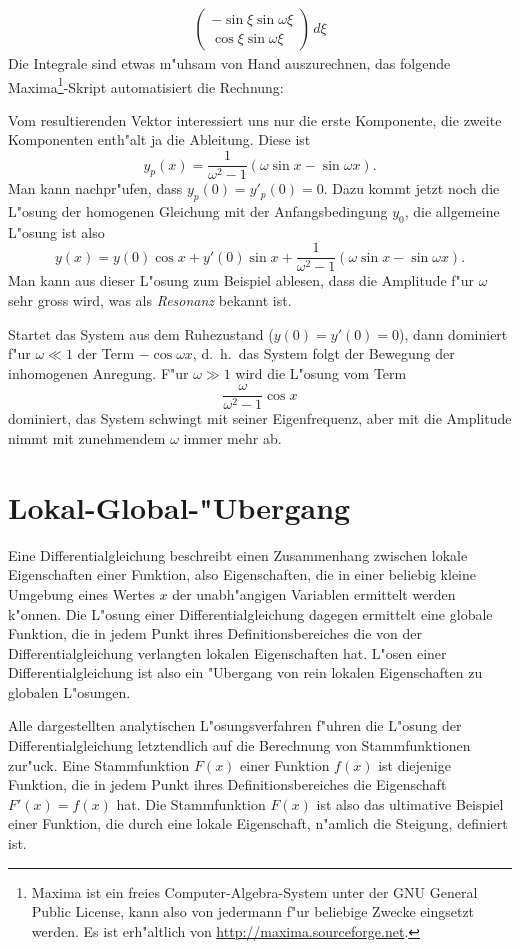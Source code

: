 \begin{beispiel}
\begin{align*}
\begin{pmatrix}
-\sin \xi\sin\omega\xi\\
 \cos \xi\sin\omega\xi
\end{pmatrix}
\,d\xi
\end{align*}
Die Integrale sind etwas m"uhsam von Hand auszurechnen, das folgende
Maxima\footnote{Maxima ist ein freies Computer-Algebra-System unter der
GNU General Public License, kann also von jedermann f"ur beliebige
Zwecke eingsetzt werden. Es ist erh"altlich von
\url{http://maxima.sourceforge.net}.}-Skript automatisiert
die Rechnung:

Vom resultierenden Vektor interessiert uns nur die erste Komponente,
die zweite Komponenten enth"alt ja die Ableitung.
Diese ist
\[
y_p(x)=\frac1{\omega^2-1}(\omega\sin x-\sin\omega x).
\]
Man kann nachpr"ufen, dass $y_p(0)=y'_p(0)=0$.
Dazu kommt jetzt noch die L"osung der homogenen Gleichung mit der
Anfangsbedingung $y_0$, die allgemeine L"osung ist also
\[
y(x)=y(0) \cos x +y'(0)\sin x+\frac1{\omega^2-1}(\omega\sin x -\sin\omega x).
\]
Man kann aus dieser L"osung zum Beispiel ablesen, dass die Amplitude
f"ur $\omega$ sehr gross wird, was als {\em Resonanz} bekannt ist.

Startet das System aus dem Ruhezustand ($y(0)=y'(0)=0$), dann dominiert
f"ur $\omega\ll 1$ der Term $-\cos\omega x$, d.~h.~das System folgt der
Bewegung der inhomogenen Anregung.
F"ur $\omega \gg 1$ wird die L"osung vom Term
\[
\frac{\omega}{\omega^2-1}\cos x
\]
dominiert, das System schwingt mit seiner Eigenfrequenz, aber mit die
Amplitude nimmt mit zunehmendem $\omega$ immer mehr ab.
\end{beispiel}

\section{Lokal-Global-"Ubergang}
Eine Differentialgleichung beschreibt einen Zusammenhang zwischen
lokale Eigenschaften einer Funktion, also Eigenschaften, die in einer
beliebig kleine Umgebung eines Wertes $x$ der unabh"angigen Variablen
ermittelt werden k"onnen.
Die L"osung einer Differentialgleichung dagegen ermittelt eine globale
Funktion, die in jedem Punkt ihres Definitionsbereiches die von der
Differentialgleichung verlangten lokalen Eigenschaften hat.
L"osen einer Differentialgleichung ist also ein "Ubergang von rein lokalen
Eigenschaften zu globalen L"osungen.

Alle dargestellten analytischen L"osungsverfahren f"uhren die L"osung
der Differentialgleichung letztendlich auf die Berechnung von Stammfunktionen
zur"uck.
Eine Stammfunktion $F(x)$ einer Funktion $f(x)$ ist diejenige Funktion,
die in jedem Punkt ihres Definitionsbereiches die Eigenschaft $F'(x)=f(x)$
hat.
Die Stammfunktion $F(x)$ ist also das ultimative Beispiel einer Funktion,
die durch eine lokale Eigenschaft, n"amlich die Steigung, definiert ist.

